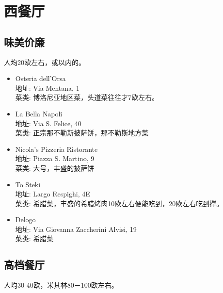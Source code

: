 \section{西餐厅}

\subsection{味美价廉}
人均20欧左右，或以内的。

\begin{itemize}
\item Osteria dell'Orsa\\
地址: Via Mentana, 1\\
菜类: 博洛尼亚地区菜，头道菜往往才7欧左右。

\item La Bella Napoli\\
地址: Via S. Felice, 40\\
菜类: 正宗那不勒斯披萨饼，那不勒斯地方菜

\item Nicola's Pizzeria Ristorante\\
地址: Piazza S. Martino, 9\\
菜类: 大号，丰盛的披萨饼

\item To Steki\\
地址: Largo Respighi, 4E\\
菜类: 希腊菜，丰盛的希腊烤肉10欧左右便能吃到，20欧左右吃到撑。

\item Delogo\\
地址: Via Giovanna Zaccherini Alvisi, 19\\
菜类: 希腊菜

\end{itemize}

\subsection{高档餐厅}
人均30-40欧，米其林80－100欧左右。

